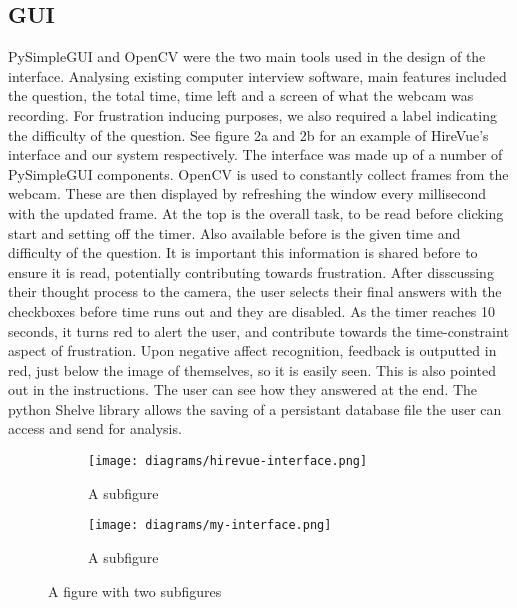 \documentclass[12pt,a4paper]{article}
\begin{document}
\subsection*{GUI}
PySimpleGUI and OpenCV were the two main tools used in the design of the interface. Analysing existing computer interview software, main features included the question, the total time, time left and a screen of what the webcam was recording. For frustration inducing purposes, we also required a label indicating the difficulty of the question. See figure 2a and 2b for an example of HireVue's interface and our system respectively. The interface was made up of a number of PySimpleGUI components. OpenCV is used to constantly collect frames from the webcam. These are then displayed by refreshing the window every millisecond with the updated frame. At the top is the overall task, to be read before clicking start and setting off the timer. Also available before is the given time and difficulty of the question. It is important this information is shared before to ensure it is read, potentially contributing towards frustration. After disscussing their thought process to the camera, the user selects their final answers with the checkboxes before time runs out and they are disabled. As the timer reaches 10 seconds, it turns red to alert the user, and contribute towards the time-constraint aspect of frustration. Upon negative affect recognition, feedback is outputted in red, just below the image of themselves, so it is easily seen. This is also pointed out in the instructions. The user can see how they answered at the end. The python Shelve library allows the saving of a persistant database file the user can access and send for analysis. 

\begin{figure}
	\centering
	\begin{subfigure}{.5\textwidth}
		\centering
		\texttt{[image: diagrams/hirevue-interface.png]}
		\caption{A subfigure}
		\label{fig:sub1}
	\end{subfigure}%
	\begin{subfigure}{.5\textwidth}
		\centering
		\texttt{[image: diagrams/my-interface.png]}
		\caption{A subfigure}
		\label{fig:sub2}
	\end{subfigure}
	\caption{A figure with two subfigures}
	\label{fig:test}
\end{figure}
\end{document}
